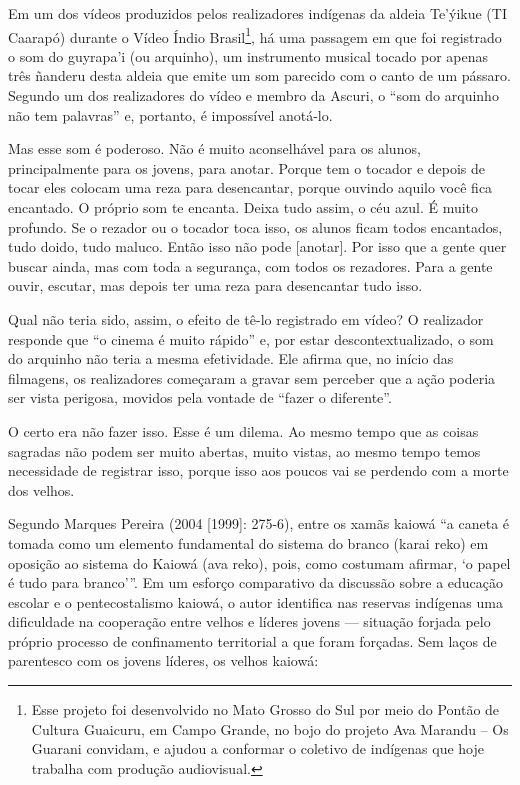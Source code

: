 Em um dos vídeos produzidos pelos realizadores indígenas da aldeia
Te’ýikue (TI Caarapó) durante o Vídeo Índio Brasil\footnote{Esse
projeto foi desenvolvido no Mato Grosso do Sul por meio do Pontão de
Cultura Guaicuru, em Campo Grande, no bojo do projeto Ava Marandu – Os
Guarani convidam, e ajudou a conformar o coletivo de indígenas que hoje
trabalha com produção audiovisual.  }, há uma passagem em que foi
registrado o som do guyrapa’i (ou arquinho), um instrumento musical
tocado por apenas três ñanderu desta aldeia que emite um som parecido
com o canto de um pássaro. Segundo um dos realizadores do vídeo e
membro da Ascuri, o ``som do arquinho não tem palavras'' e, portanto, é
impossível anotá-lo.

Mas esse som é poderoso. Não é muito aconselhável para os alunos,
principalmente para os jovens, para anotar. Porque tem o tocador e
depois de tocar eles colocam uma reza para desencantar, porque ouvindo
aquilo você fica encantado. O próprio som te encanta. Deixa tudo assim,
o céu azul. É muito profundo. Se o rezador ou o tocador toca isso, os
alunos ficam todos encantados, tudo doido, tudo maluco. Então isso não
pode [anotar]. Por isso que a gente quer buscar ainda, mas com toda a
segurança, com todos os rezadores. Para a gente ouvir, escutar, mas
depois ter uma reza para desencantar tudo isso.

Qual não teria sido, assim, o efeito de tê-lo registrado em vídeo? O
realizador responde que ``o cinema é muito rápido'' e, por estar
descontextualizado, o som do arquinho não teria a mesma efetividade.
Ele afirma que, no início das filmagens, os realizadores começaram a
gravar sem perceber que a ação poderia ser vista perigosa, movidos pela
vontade de ``fazer o diferente''.

O certo era não fazer isso. Esse é um dilema. Ao mesmo tempo que as
coisas sagradas não podem ser muito abertas, muito vistas, ao mesmo
tempo temos necessidade de registrar isso, porque isso aos poucos vai
se perdendo com a morte dos velhos.

Segundo Marques Pereira (2004 [1999]: 275-6), entre os xamãs kaiowá ``a
caneta é tomada como um elemento fundamental do sistema do branco
(karai reko) em oposição ao sistema do Kaiowá (ava reko), pois, como
costumam afirmar, ‘o papel é tudo para branco’''. Em um esforço
comparativo da discussão sobre a educação escolar e o pentecostalismo
kaiowá, o autor identifica nas reservas indígenas uma dificuldade na
cooperação entre velhos e líderes jovens — situação forjada pelo
próprio processo de confinamento territorial a que foram forçadas. Sem
laços de parentesco com os jovens líderes, os velhos kaiowá:

